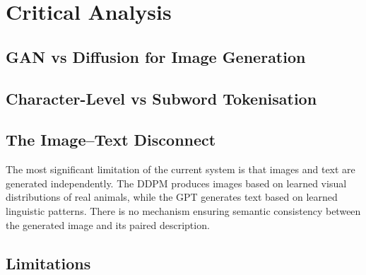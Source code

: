\documentclass[12pt,a4paper]{article}
\begin{document}

\section{Critical Analysis}
\label{sec:critical}

\subsection{GAN vs Diffusion for Image Generation}


\subsection{Character-Level vs Subword Tokenisation}


\subsection{The Image--Text Disconnect}

The most significant limitation of the current system is that images and text are generated independently. The DDPM produces images based on learned visual distributions of real animals, while the GPT generates text based on learned linguistic patterns. There is no mechanism ensuring semantic consistency between the generated image and its paired description.


\subsection{Limitations}
\end{document}
